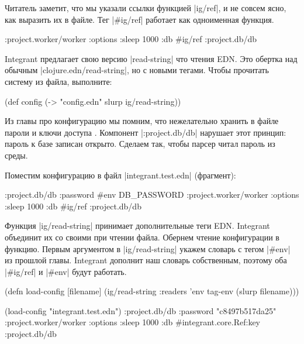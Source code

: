 Читатель заметит, что мы указали ссылки функцией \spverb|ig/ref|, и не совсем
ясно, как выразить их в файле. Тег \spverb|#ig/ref| работает как одноименная
функция.

\begin{english}
  \begin{clojure}
{:project.worker/worker {:options {:sleep 1000}
                         :db #ig/ref :project.db/db}}
  \end{clojure}
\end{english}

Integrant предлагает свою версию \spverb|read-string| что чтения EDN. Это
обертка над обычным \spverb|clojure.edn/read-string|, но с новыми тегами. Чтобы
прочитать систему из файла, выполните:

\begin{english}
  \begin{clojure}
(def config
  (-> "config.edn" slurp ig/read-string))
  \end{clojure}
\end{english}

Из главы про конфигурацию мы помним, что нежелательно хранить в файле пароли и
ключи доступа . Компонент \spverb|:project.db/db| нарушает
этот принцип: пароль к базе записан открыто. Сделаем так, чтобы парсер читал
пароль из среды.

Поместим конфигурацию в файл \spverb|integrant.test.edn| (фрагмент):

\begin{english}
  \begin{clojure}
{:project.db/db {:password #env DB_PASSWORD}
 :project.worker/worker {:options {:sleep 1000}
                         :db #ig/ref :project.db/db}}
  \end{clojure}
\end{english}

Функция \spverb|ig/read-string| принимает дополнительные теги EDN. Integrant
объединит их со своими при чтении файла. Обернем чтение конфигурации в
функцию. Первым аргументом в \spverb|ig/read-string| укажем словарь с тегом
\spverb|#env| из прошлой главы. Integrant дополнит наш словарь собственным,
поэтому оба \spverb|#ig/ref| и \spverb|#env| будут работать.

\begin{english}
  \begin{clojure}
(defn load-config [filename]
  (ig/read-string {:readers {'env tag-env}}
                  (slurp filename)))

(load-config "integrant.test.edn")
{:project.db/db {:password "c8497b517da25"}
 :project.worker/worker
 {:options {:sleep 1000}
  :db #integrant.core.Ref{:key :project.db/db}}}
  \end{clojure}
\end{english}

